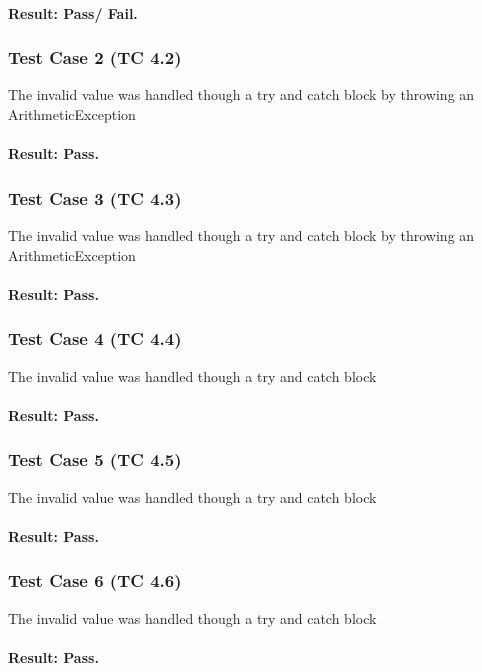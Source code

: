 \documentclass[a4paper,12pt]{article}
\begin{document}
\paragraph{Result: Pass/ Fail.}

\subsubsection{Test Case 2 (TC 4.2)}
The invalid value was handled though a try and catch block by throwing an ArithmeticException 

\paragraph{Result: Pass.}
\subsubsection{Test Case 3 (TC 4.3)}
The invalid value was handled though a try and catch block by throwing an ArithmeticException 

\paragraph{Result: Pass.}

\subsubsection{Test Case 4 (TC 4.4)}
The invalid value was handled though a try and catch block 
\paragraph{Result: Pass.}

\subsubsection{Test Case 5 (TC 4.5)}
The invalid value was handled though a try and catch block 
\paragraph{Result: Pass.}

\subsubsection{Test Case 6 (TC 4.6)}
The invalid value was handled though a try and catch block 
\paragraph{Result: Pass.}
\end{document}
